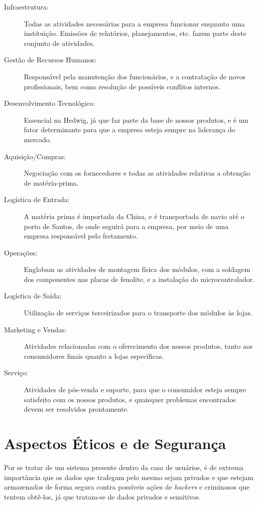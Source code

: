 \begin{description}
    \item[Infraestrutura:]Todas as atividades necessárias para a empresa funcionar enquanto uma instituição. Emissões de relatórios, planejamentos, etc. fazem parte deste conjunto de atividades.

    \item[Gestão de Recursos Humanos:]Responsável pela manutenção dos funcionários, e a contratação de novos profissionais, bem como resolução de possíveis conflitos internos.

    \item[Desenvolvimento Tecnológico:]Essencial na Hedwig, já que faz parte da base de nossos produtos, e é um fator determinante para que a empresa esteja sempre na liderança do mercado.

    \item[Aquisição/Compras:]Negociação com os fornecedores e todas as atividades relativas a obtenção de matéria-prima.

    \item[Logística de Entrada:]A matéria prima é importada da China, e é transportada de navio até o porto de Santos, de onde seguirá para a empresa, por meio de uma empresa responsável pelo fretamento.

    \item[Operações:]Englobam as atividades de montagem física dos módulos, com a soldagem dos componentes nas placas de fenolite, e a instalação do microcontrolador.
    
    \item[Logística de Saída:]Utilização de serviços terceirizados para o transporte dos módulos às lojas.

    \item[Marketing e Vendas:]Atividades relacionadas com o oferecimento dos nossos produtos, tanto aos consumidores finais quanto a lojas específicas.

    \item[Serviço:]Atividades de pós-venda e suporte, para que o consumidor esteja sempre satisfeito com os nossos produtos, e quaisquer problemas encontrados devem ser resolvidos prontamente.
\end{description}

\section{Aspectos Éticos e de Segurança}

Por se tratar de um sistema presente dentro da casa de usuários, é de extrema importância que os dados que trafegam pelo mesmo sejam privados e que estejam armazenados de forma segura contra possíveis ações de \textit{hackers} e criminosos que tentem obtê-los, já que tratam-se de dados privados e sensitivos.

